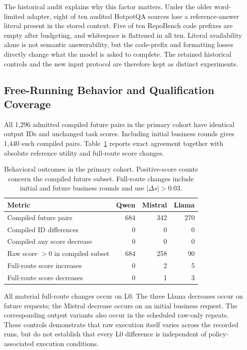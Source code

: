 The historical audit explains why this factor matters. Under the older word-limited adapter, eight of ten audited HotpotQA sources lose a reference-answer literal present in the stored context. Five of ten RepoBench code prefixes are empty after budgeting, and whitespace is flattened in all ten. Literal availability alone is not semantic answerability, but the code-prefix and formatting losses directly change what the model is asked to complete. The retained historical controls and the new input protocol are therefore kept as distinct experiments.

\subsection{Free-Running Behavior and Qualification Coverage}
\label{sec:quality}
All 1,296 admitted compiled future pairs in the primary cohort have identical output IDs and unchanged task scores. Including initial business rounds gives 1,440 such compiled pairs. Table~\ref{tab:quality} reports exact agreement together with absolute reference utility and full-route score changes.

\begin{table}[t]
\centering\small
\caption{Behavioral outcomes in the primary cohort. Positive-score counts concern the compiled future subset. Full-route changes include initial and future business rounds and use $|\Delta s|>0.03$.}
\label{tab:quality}
\begin{tabular}{@{}lrrr@{}}
\toprule
Metric & Qwen & Mistral & Llama\\
\midrule
Compiled future pairs & 684 & 342 & 270\\
Compiled ID differences & 0 & 0 & 0\\
Compiled any score decrease & 0 & 0 & 0\\
Raw score $>0$ in compiled subset & 684 & 258 & 90\\
Full-route score increases & 0 & 2 & 5\\
Full-route score decreases & 0 & 1 & 3\\
\bottomrule
\end{tabular}
\end{table}

All material full-route changes occur on L0. The three Llama decreases occur on future requests; the Mistral decrease occurs on an initial business request. The corresponding output variants also occur in the scheduled raw-only repeats. These controls demonstrate that raw execution itself varies across the recorded runs, but do not establish that every L0 difference is independent of policy-associated execution conditions.


